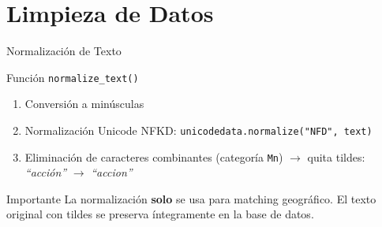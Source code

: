 \documentclass[11pt,aspectratio=169,spanish]{beamer}
\begin{document}
\section{Limpieza de Datos}

\begin{frame}[fragile]{Normalización de Texto}
    \begin{block}{Función \texttt{normalize\_text()}}
        \begin{enumerate}
            \item Conversión a minúsculas
            \item Normalización Unicode NFKD:
            \texttt{unicodedata.normalize("NFD", text)}
            \item Eliminación de caracteres combinantes (categoría \texttt{Mn})
            $\rightarrow$ quita tildes: \textit{``acción''} $\to$ \textit{``accion''}
        \end{enumerate}
    \end{block}

    \vspace{0.3cm}
    \begin{alertblock}{Importante}
        La normalización \textbf{solo} se usa para matching geográfico.
        El texto original con tildes se preserva íntegramente en la base de datos.
    \end{alertblock}
\end{frame}
\end{document}
